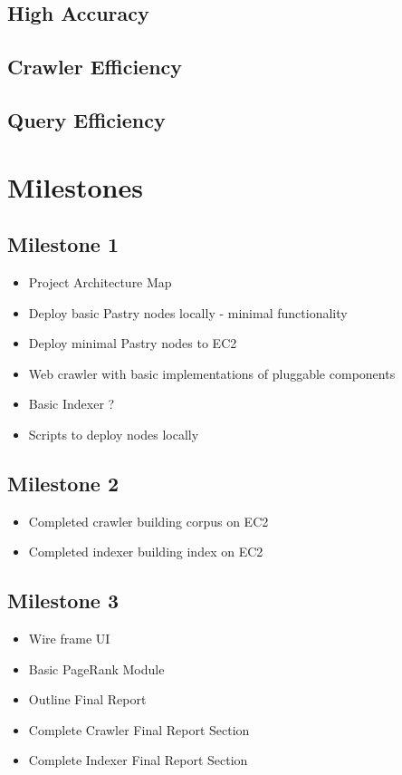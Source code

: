 \documentclass[11pt, letterpaper, oneside, twocolumn]{article}
\begin{document}
\subsection{ High Accuracy }
\subsection{ Crawler Efficiency }
\subsection{ Query Efficiency }

\section{ Milestones }

\subsection{Milestone 1}

\begin{itemize}
\item            Project Architecture Map
\item            Deploy basic Pastry nodes locally - minimal functionality
\item            Deploy minimal Pastry nodes to EC2
\item            Web crawler with basic implementations of pluggable components
\item            Basic Indexer ?
\item            Scripts to deploy nodes locally 
\end{itemize}


\subsection{Milestone 2}

\begin{itemize}
\item            Completed crawler building corpus on EC2
\item            Completed indexer building index on EC2
\end{itemize}


\subsection{Milestone 3}

\begin{itemize}
\item            Wire frame UI
\item            Basic PageRank Module
\item            Outline Final Report
\item            Complete Crawler Final Report Section
\item            Complete Indexer Final Report Section
\end{itemize}
\end{document}
